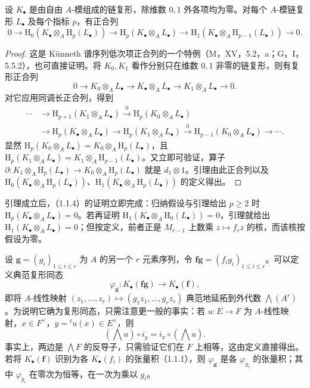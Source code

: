 设 $K_\bullet$ 是由自由 $A$-模组成的链复形，除维数 $0,1$ 外各项均为零。对每个 $A$-模链复形 $L_\bullet$ 及每个指标 $p$，有正合列
\[
0\to\mathrm H_0(K_\bullet\otimes_A\mathrm H_p(L_\bullet))
\to\mathrm H_p(K_\bullet\otimes_AL_\bullet)
\to\mathrm H_1(K_\bullet\otimes_A\mathrm H_{p-1}(L_\bullet))\to0.
\]
\begin{proof}
这是 Künneth 谱序列低次项正合列的一个特例（M，XV，5.2，a；G，I，5.5.2），也可直接证明。将 $K_0,K_1$ 看作分别只在维数 $0,1$ 非零的链复形，则有复形正合列
\[
0\to K_0\otimes_AL_\bullet\to K_\bullet\otimes_AL_\bullet\to K_1\otimes_AL_\bullet\to0.
\]
对它应用同调长正合列，得到
\[
\begin{aligned}
\cdots&\to\mathrm H_{p+1}(K_1\otimes_AL_\bullet)\xrightarrow{\partial}\mathrm H_p(K_0\otimes_AL_\bullet)\\
&\to\mathrm H_p(K_\bullet\otimes_AL_\bullet)\to\mathrm H_p(K_1\otimes_AL_\bullet)
\xrightarrow{\partial}\mathrm H_{p-1}(K_0\otimes_AL_\bullet)\to\cdots.
\end{aligned}
\]
显然 $\mathrm H_p(K_0\otimes_AL_\bullet)=K_0\otimes_A\mathrm H_p(L_\bullet)$，且
$\mathrm H_p(K_1\otimes_AL_\bullet)=K_1\otimes_A\mathrm H_{p-1}(L_\bullet)$。又立即可验证，算子 $\partial:K_1\otimes_A\mathrm H_p(L_\bullet)\to K_0\otimes_A\mathrm H_p(L_\bullet)$ 就是 $d_1\otimes1$。引理由此正合列以及 $\mathrm H_0(K_\bullet\otimes_A\mathrm H_p(L_\bullet))$、$\mathrm H_1(K_\bullet\otimes_A\mathrm H_p(L_\bullet))$ 的定义得出。
\end{proof}
引理成立后，（1.1.4）的证明立即完成：归纳假设与引理给出 $p\geq2$ 时 $\mathrm H_p(K_\bullet\otimes_AL_\bullet)=0$。若再证明 $\mathrm H_1(K_\bullet\otimes_A\mathrm H_0(L_\bullet))=0$，引理就给出 $\mathrm H_1(K_\bullet\otimes_AL_\bullet)=0$；但按定义，前者正是 $M_{r-1}$ 上数乘 $z\mapsto f_rz$ 的核，而该核按假设为零。\finishproof

设 $\mathbf g=(g_i)_{1\leq i\leq r}$ 为 $A$ 的另一个 $r$ 元素序列，令 $\mathbf{fg}=(f_ig_i)_{1\leq i\leq r}$。可以定义典范复形同态
\begin{equation}\tag{1.1.5.1}
\varphi_{\mathbf g}:K_\bullet(\mathbf{fg})\to K_\bullet(\mathbf f),
\end{equation}
即将 $A$-线性映射 $(z_1,\ldots,z_r)\mapsto(g_1z_1,\ldots,g_rz_r)$ 典范地延拓到外代数 $\bigwedge(A^r)$。为说明它确为复形同态，只需注意更一般的事实：若 $u:E\to F$ 为 $A$-线性映射，$x\in F^\vee$，$y={}^tu(x)\in E^\vee$，则
\begin{equation}\tag{1.1.5.2}
(\bigwedge u)\circ i_y=i_x\circ(\bigwedge u).
\end{equation}
事实上，两边是 $\bigwedge F$ 的反导子，只需验证它们在 $F$ 上相等，这由定义直接得出。
若将 $K_\bullet(\mathbf f)$ 识别为各 $K_\bullet(f_i)$ 的张量积（1.1.1），则 $\varphi_{\mathbf g}$ 是各 $\varphi_{g_i}$ 的张量积；其中 $\varphi_{g_i}$ 在零次为恒等，在一次为乘以 $g_i$。

